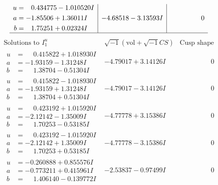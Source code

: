 \documentclass[1p]{elsarticle_modified}
\theoremstyle{definition}
\newcommand{\I}{\sqrt{-1}}
\begin{document}
$$\begin{array}{c|c|c}
\begin{aligned}
u &= \phantom{-}0.434775 - 1.010520 I \\
a &= -1.85506 + 1.36011 I \\
b &= \phantom{-}1.75251 + 0.02324 I\end{aligned}
 & -4.68518 - 3.13593 I & \phantom{-0.000000 } 0\\
 \hline 
 \end{array}$$\newpage$$\begin{array}{c|c|c}  
\text{Solutions to }I^u_{1}& \I (\text{vol} + \sqrt{-1}CS) & \text{Cusp shape}\\
 \hline 
\begin{aligned}
u &= \phantom{-}0.415822 + 1.018930 I \\
a &= -1.93159 - 1.31248 I \\
b &= \phantom{-}1.38704 - 0.51304 I\end{aligned}
 & -4.79017 + 3.14126 I & \phantom{-0.000000 } 0 \\ \hline\begin{aligned}
u &= \phantom{-}0.415822 - 1.018930 I \\
a &= -1.93159 + 1.31248 I \\
b &= \phantom{-}1.38704 + 0.51304 I\end{aligned}
 & -4.79017 - 3.14126 I & \phantom{-0.000000 } 0 \\ \hline\begin{aligned}
u &= \phantom{-}0.423192 + 1.015920 I \\
a &= -2.12142 - 1.35009 I \\
b &= \phantom{-}1.70253 - 0.53185 I\end{aligned}
 & -4.77778 + 3.15386 I & \phantom{-0.000000 } 0 \\ \hline\begin{aligned}
u &= \phantom{-}0.423192 - 1.015920 I \\
a &= -2.12142 + 1.35009 I \\
b &= \phantom{-}1.70253 + 0.53185 I\end{aligned}
 & -4.77778 - 3.15386 I & \phantom{-0.000000 } 0 \\ \hline\begin{aligned}
u &= -0.260888 + 0.855576 I \\
a &= -0.773211 + 0.415961 I \\
b &= \phantom{-}1.406140 - 0.139772 I\end{aligned}
 & -2.53837 - 0.97499 I & \phantom{-0.000000 } 0 \\ \hline\begin{aligned}

\end{aligned}
\end{array}$$
\end{document}
